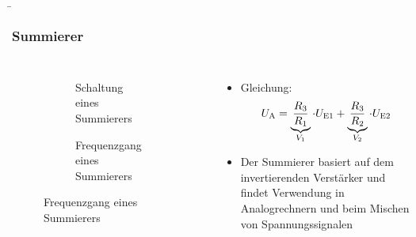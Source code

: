 \begin{frame}
    \b{
        \frametitle{Summierer}
        \begin{columns}
            \centering
            \begin{figure}
                \centering
                \begin{subfigure}{\linewidth}
                    \centering
                    \scalebox{1}{}
                    \caption{Schaltung eines Summierers}
                \end{subfigure}
                \begin{subfigure}{\linewidth}
                    \centering
                    \scalebox{0.7}{}
                    \caption{Frequenzgang eines Summierers}
                \end{subfigure}
            \end{figure}

            \begin{itemize}
                \item Gleichung:
                      \[
                          U_{\textnormal{A}} = \underbrace{\frac{R_3} {R_1}}_{V_1} \cdot U_{\textnormal{E1}} + \underbrace{\frac{R_3} {R_2}}_{V_2} \cdot U_{\textnormal{E2}}
                      \]
                \item Der Summierer basiert auf dem invertierenden Verstärker und findet Verwendung in Analogrechnern und beim Mischen von Spannungssignalen
            \end{itemize}
        \end{columns}
    }
\end{frame}


